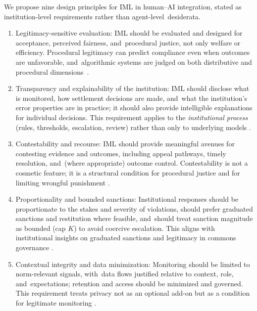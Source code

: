 \documentclass[mca,article,accept,pdftex,oneauthor]{Definitions/mdpi}
\begin{document}
We propose nine design principles for IML in human--AI integration, stated as institution-level requirements rather than agent-level~desiderata.
\begin{enumerate}
    \item Legitimacy-sensitive evaluation:
IML should be evaluated and designed for acceptance, perceived fairness, and~procedural justice, not only welfare or efficiency. Procedural legitimacy can predict compliance even when outcomes are unfavorable, and~algorithmic systems are judged on both distributive and procedural \mbox{dimensions \citep{Tyler1990,Lee2019ProceduralJustice}.}

    \item Transparency and explainability of the institution:
IML should disclose what is monitored, how settlement decisions are made, and~what the institution’s error properties are in practice; it should also provide intelligible explanations for individual decisions. This requirement applies to the \emph{institutional process} (rules, thresholds, escalation, review) rather than only to underlying models \citep{Kroll2017AccountableAlgorithms,Binns2018CHI}.

    \item Contestability and recourse:
IML should provide meaningful avenues for contesting evidence and outcomes, including appeal pathways, timely resolution, and~(where appropriate) outcome control. Contestability is not a cosmetic feature; it is a structural condition for procedural justice and for limiting wrongful punishment \citep{Lee2019ProceduralJustice,Wachter2018Counterfactual}.

    \item Proportionality and bounded sanctions:
Institutional responses should be proportionate to the stakes and severity of violations, should prefer graduated sanctions and restitution where feasible, and~should treat sanction magnitude as bounded (cap $K$) to avoid coercive escalation. This aligns with institutional insights on graduated sanctions and legitimacy in commons governance \citep{Ostrom1990}.

    \item Contextual integrity and data minimization:
Monitoring should be limited to norm-relevant signals, with~data flows justified relative to context, role, and~expectations; retention and access should be minimized and governed. This requirement treats privacy not as an optional add-on but as a condition for legitimate monitoring \citep{Nissenbaum2004}.


\end{enumerate}
\end{document}
